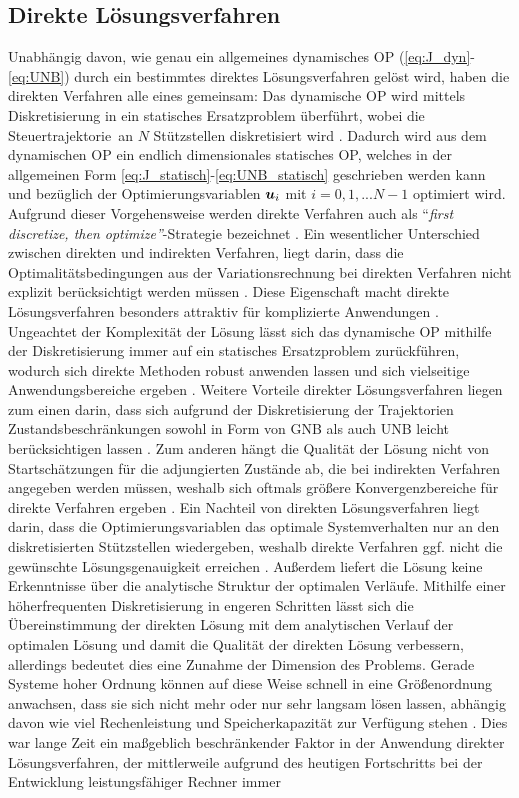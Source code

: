\subsection{Direkte Lösungsverfahren}\label{subsec:Direkt}
Unabhängig davon, wie genau ein allgemeines dynamisches \gls{OP} (\eqref{eq:J_dyn}- \eqref{eq:UNB}) durch ein bestimmtes direktes Lösungsverfahren gelöst wird, haben die direkten Verfahren alle eines gemeinsam: Das dynamische \gls{OP} wird mittels Diskretisierung in ein statisches Ersatzproblem überführt, wobei die Steuertrajektorie \uoft\,an $N$ Stützstellen diskretisiert wird \cite{KnutGraichen.2012}. Dadurch wird aus dem dynamischen \gls{OP} ein endlich dimensionales statisches \gls{OP}, welches in der allgemeinen Form \eqref{eq:J_statisch}-\eqref{eq:UNB_statisch} geschrieben werden kann und bezüglich der Optimierungsvariablen $\boldsymbol{u}_i$ mit $i=0,1,...N-1$ optimiert wird. Aufgrund dieser Vorgehensweise werden direkte Verfahren auch als ``\textit{first discretize, then optimize''}-Strategie bezeichnet \cite{Papageorgiou.2012}. Ein wesentlicher Unterschied zwischen direkten und indirekten Verfahren, liegt darin, dass die Optimalitätsbedingungen aus der Variationsrechnung bei direkten Verfahren nicht explizit berücksichtigt werden müssen \cite{Rathgeber.2016}. Diese Eigenschaft macht direkte Lösungsverfahren besonders attraktiv für komplizierte Anwendungen \cite{Betts.1998}. Ungeachtet der Komplexität der Lösung lässt sich das dynamische \gls{OP} mithilfe der Diskretisierung immer auf ein statisches Ersatzproblem zurückführen, wodurch sich direkte Methoden robust anwenden lassen und sich vielseitige Anwendungsbereiche ergeben \cite{Betts.1998}. Weitere Vorteile direkter Lösungsverfahren liegen zum einen darin, dass sich aufgrund der Diskretisierung der Trajektorien Zustandsbeschränkungen sowohl in Form von \gls{GNB} als auch \gls{UNB} leicht berücksichtigen lassen \cite{KnutGraichen.2012}. Zum anderen hängt die Qualität der Lösung nicht von Startschätzungen für die adjungierten Zustände ab, die bei indirekten Verfahren angegeben werden müssen, weshalb sich oftmals größere Konvergenzbereiche für direkte Verfahren ergeben \cite{KnutGraichen.2012}. Ein Nachteil von direkten Lösungsverfahren liegt darin, dass die Optimierungsvariablen das optimale Systemverhalten nur an den diskretisierten Stützstellen wiedergeben, weshalb direkte Verfahren ggf. nicht die gewünschte Lösungsgenauigkeit erreichen \cite{Papageorgiou.2012}. Außerdem liefert die Lösung keine Erkenntnisse über die analytische Struktur der optimalen Verläufe. Mithilfe einer höherfrequenten Diskretisierung in engeren Schritten lässt sich die Übereinstimmung der direkten Lösung mit dem analytischen Verlauf der optimalen Lösung und damit die Qualität der direkten Lösung verbessern, allerdings bedeutet dies eine Zunahme der Dimension des Problems. Gerade Systeme hoher Ordnung können auf diese Weise schnell in eine Größenordnung anwachsen, dass sie sich nicht mehr oder nur sehr langsam lösen lassen, abhängig davon wie viel Rechenleistung und Speicherkapazität zur Verfügung stehen \cite{Papageorgiou.2012}. Dies war lange Zeit ein maßgeblich beschränkender Faktor in der Anwendung direkter Lösungsverfahren, der mittlerweile aufgrund des heutigen Fortschritts bei der Entwicklung leistungsfähiger Rechner immer 